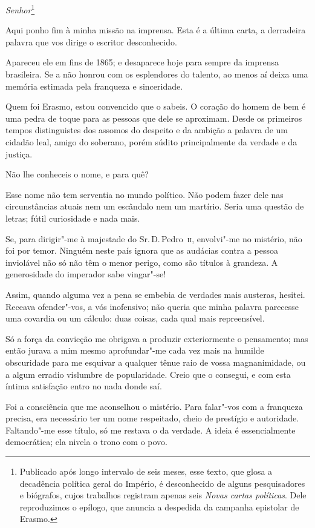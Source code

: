 \begin{linenumbers}

\noindent\textit{Senhor}\footnote{ Publicado após longo intervalo de seis meses, esse texto, 
que glosa a decadência política geral do Império, é desconhecido de alguns pesquisadores e biógrafos, 
cujos trabalhos registram apenas seis \textit{Novas cartas políticas}. Dele reproduzimos o epílogo, 
que anuncia a despedida da campanha epistolar de Erasmo.}\smallskip

 Aqui ponho fim à minha missão na imprensa. Esta é a última carta, a
derradeira palavra que vos dirige o escritor desconhecido. 

 Apareceu ele em fins de 1865; e desaparece hoje para sempre da imprensa
brasileira. Se a não honrou com os esplendores do talento, ao menos aí
deixa uma memória estimada pela franqueza e sinceridade. 

 Quem foi Erasmo, estou convencido que o sabeis. O coração do homem de
bem é uma pedra de toque para as pessoas que dele se aproximam. Desde
os primeiros tempos distinguistes dos assomos do despeito e da ambição
a palavra de um cidadão leal, amigo do soberano, porém súdito
principalmente da verdade e da justiça.

 Não lhe conheceis o nome, e para quê? 

 Esse nome não tem serventia no mundo político. Não podem fazer dele nas
circunstâncias atuais nem um escândalo nem um martírio. Seria uma
questão de letras; fútil curiosidade e nada mais. 

 Se, para dirigir"-me à majestade do Sr.\,D.\,Pedro~\textsc{ii}, envolvi"-me no
mistério, não foi por temor. Ninguém neste país ignora que as audácias
contra a pessoa inviolável não só não têm o menor perigo, como são
títulos à grandeza. A generosidade do imperador sabe vingar"-se!

 Assim, quando alguma vez a pena se embebia de verdades mais austeras,
hesitei. Receava ofender"-vos, a vós inofensivo; não queria que minha
palavra parecesse uma covardia ou um cálculo: duas coisas, cada qual
mais repreensível. 

 Só a força da convicção me obrigava a produzir exteriormente o
pensamento; mas então jurava a mim mesmo aprofundar"-me cada vez mais
na humilde obscuridade para me esquivar a qualquer tênue raio de vossa
magnanimidade, ou a algum erradio vislumbre de popularidade. Creio que
o consegui, e com esta íntima satisfação entro no nada donde saí. 

 Foi a consciência que me aconselhou o mistério. Para falar"-vos com a
franqueza precisa, era necessário ter um nome respeitado, cheio de
prestígio e autoridade. Faltando"-me esse título, só me restava o da
verdade. A ideia é essencialmente democrática; ela nivela o trono com o
povo. 


\end{linenumbers}
